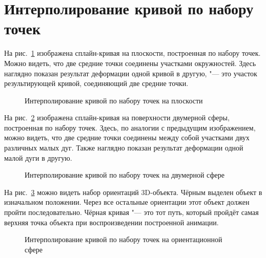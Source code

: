 \section{Интерполирование кривой по набору точек}

На рис.~\ref{picture-by-points-plane} изображена сплайн-кривая на плоскости, построенная по набору точек. Можно видеть,
что две средние точки соединены участками окружностей. Здесь наглядно показан результат деформации одной кривой
в другую, "--- это участок результирующей кривой, соединяющий две средние точки.

\begin{figure}[h!]
\caption{Интерполирование кривой по набору точек на плоскости}
\label{picture-by-points-plane}
\end{figure}

На рис.~\ref{picture-by-points-two-dimension} изображена сплайн-кривая на поверхности двумерной сферы, построенная
по набору точек. Здесь, по аналогии с предыдущим изображением, можно видеть, что две средние точки соединены между собой
участками двух различных малых дуг. Также наглядно показан результат деформации одной малой дуги в другую.

\begin{figure}[h!]
\caption{Интерполирование кривой по набору точек на двумерной сфере}
\label{picture-by-points-two-dimension}
\end{figure}

На рис.~\ref{picture-by-points-orientation} можно видеть набор ориентаций 3D-объекта. Чёрным выделен объект
в изначальном положении. Через все остальные ориентации этот объект должен пройти последовательно. Чёрная
кривая "--- это тот путь, который пройдёт самая верхняя точка объекта при воспроизведении построенной анимации.

\begin{figure}[h!]
\caption{Интерполирование кривой по набору точек на ориентационной сфере}
\label{picture-by-points-orientation}
\end{figure}

